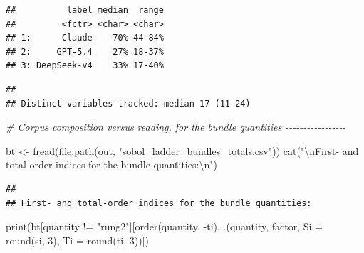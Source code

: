 \documentclass[
  11pt,
]{article}
\newenvironment{Shaded}{\begin{snugshade}}{\end{snugshade}}
\newcommand{\AttributeTok}[1]{\textcolor[rgb]{0.77,0.63,0.00}{#1}}
\newcommand{\CommentTok}[1]{\textcolor[rgb]{0.56,0.35,0.01}{\textit{#1}}}
\newcommand{\DecValTok}[1]{\textcolor[rgb]{0.00,0.00,0.81}{#1}}
\newcommand{\FunctionTok}[1]{\textcolor[rgb]{0.00,0.00,0.00}{#1}}
\newcommand{\NormalTok}[1]{#1}
\newcommand{\OtherTok}[1]{\textcolor[rgb]{0.56,0.35,0.01}{#1}}
\newcommand{\SpecialCharTok}[1]{\textcolor[rgb]{0.00,0.00,0.00}{#1}}
\newcommand{\StringTok}[1]{\textcolor[rgb]{0.31,0.60,0.02}{#1}}
\begin{document}
\begin{verbatim}
##          label median  range
##         <fctr> <char> <char>
## 1:      Claude    70% 44-84%
## 2:     GPT-5.4    27% 18-37%
## 3: DeepSeek-v4    33% 17-40%
\end{verbatim}

\begin{Shaded}
\end{Shaded}

\begin{verbatim}
## 
## Distinct variables tracked: median 17 (11-24)
\end{verbatim}

\begin{Shaded}
\begin{Highlighting}[]
\CommentTok{\# Corpus composition versus reading, for the bundle quantities {-}{-}{-}{-}{-}{-}{-}{-}{-}{-}{-}{-}{-}{-}{-}{-}{-}}

\NormalTok{bt }\OtherTok{\textless{}{-}} \FunctionTok{fread}\NormalTok{(}\FunctionTok{file.path}\NormalTok{(out, }\StringTok{"sobol\_ladder\_bundles\_totals.csv"}\NormalTok{))}
\FunctionTok{cat}\NormalTok{(}\StringTok{"}\SpecialCharTok{\textbackslash{}n}\StringTok{First{-} and total{-}order indices for the bundle quantities:}\SpecialCharTok{\textbackslash{}n}\StringTok{"}\NormalTok{)}
\end{Highlighting}
\end{Shaded}

\begin{verbatim}
## 
## First- and total-order indices for the bundle quantities:
\end{verbatim}

\begin{Shaded}
\begin{Highlighting}[]
\FunctionTok{print}\NormalTok{(bt[quantity }\SpecialCharTok{!=} \StringTok{"rung2"}\NormalTok{][}\FunctionTok{order}\NormalTok{(quantity, }\SpecialCharTok{{-}}\NormalTok{ti),}
\NormalTok{         .(quantity, factor, }\AttributeTok{Si =} \FunctionTok{round}\NormalTok{(si, }\DecValTok{3}\NormalTok{), }\AttributeTok{Ti =} \FunctionTok{round}\NormalTok{(ti, }\DecValTok{3}\NormalTok{))])}
\end{Highlighting}
\end{Shaded}
\end{document}
